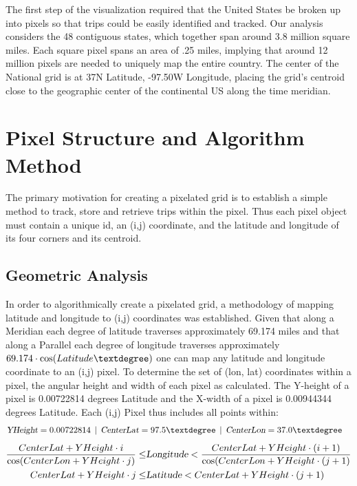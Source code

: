 
The first step of the visualization required that the United States
be broken up into pixels so that trips could be easily identified
and tracked. Our analysis considers the 48 contiguous states,
which together span around 3.8 million square miles. Each square
pixel spans an area of .25 miles, implying that around 12 million 
pixels are needed to uniquely map the entire country. 
The center of the National grid is at 37\textdegree  N Latitude, 
-97.50\textdegree W Longitude, placing the grid's centroid
close to the geographic center of the continental US along the time meridian.


\section{Pixel Structure and Algorithm Method}
The primary motivation for creating a pixelated grid is 
to establish a simple method to track, store and retrieve 
trips within the pixel. Thus each pixel object 
must contain a unique id, an (i,j) coordinate, and
the latitude and longitude of its four corners and its centroid.  

\subsection{Geometric Analysis}
In order to algorithmically create a pixelated grid, a methodology 
of mapping latitude and longitude to (i,j) coordinates was established. 
Given that along a Meridian each degree of latitude traverses approximately 69.174 miles and
that along a Parallel each degree of longitude traverses approximately $69.174\cdot \cos(Latitude\textdegree)$
one can map any latitude and longitude coordinate to an (i,j) pixel. To determine the set of (lon, lat) coordinates
within a pixel, the angular height and width of each pixel as calculated. The Y-height of a pixel is 0.00722814 degrees Latitude and 
the X-width of a pixel is 0.00944344 degrees Latitude. 
Each (i,j) Pixel thus includes all points within:
\begin{align}
	&\textsl{YHeight} = 0.00722814  \:\: | \: \: \textsl{CenterLat} = 97.5\textdegree \: \: | \: \: \textsl{CenterLon} = 37.0\textdegree
\end{align}
\begin{align}
	\frac{CenterLat + YHeight \cdot i}{\cos(CenterLon + YHeight \cdot j)} \leq &\textsl{Longitude}  
	< \frac{CenterLat + YHeight \cdot (i+1)}{\cos(CenterLon + YHeight\cdot (j+1)} \\
	CenterLat + YHeight\cdot j \leq & \textsl{Latitude} < CenterLat + YHeight \cdot (j+1)
\end{align}

